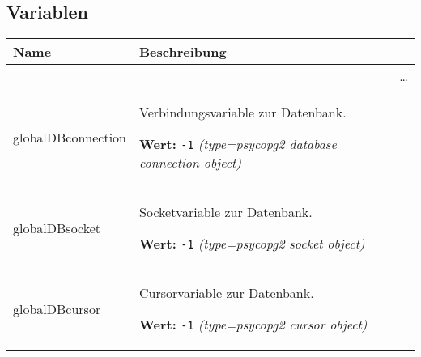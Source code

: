 
  \subsection{Variablen}

    \vspace{-1cm}
\hspace{\varindent}\begin{longtable}{|p{\varnamewidth}|p{\vardescrwidth}|l}
\cline{1-2}
\cline{1-2} \centering \textbf{Name} & \centering \textbf{Beschreibung}& \\
\cline{1-2}
\endhead\cline{1-2}\multicolumn{3}{r}{\small\ldots}\\\endfoot\cline{1-2}
\endlastfoot\raggedright g\-l\-o\-b\-a\-l\-D\-B\-c\-o\-n\-n\-e\-c\-t\-i\-o\-n\- & \raggedright Verbindungsvariable zur Datenbank.

\textbf{Wert:} 
{\tt -1}            {\it (type=psycopg2 database connection object)}&\\
\cline{1-2}
\raggedright g\-l\-o\-b\-a\-l\-D\-B\-s\-o\-c\-k\-e\-t\- & \raggedright Socketvariable zur Datenbank.

\textbf{Wert:} 
{\tt -1}            {\it (type=psycopg2 socket object)}&\\
\cline{1-2}
\raggedright g\-l\-o\-b\-a\-l\-D\-B\-c\-u\-r\-s\-o\-r\- & \raggedright Cursorvariable zur Datenbank.

\textbf{Wert:} 
{\tt -1}            {\it (type=psycopg2 cursor object)}&\\
\cline{1-2}
\end{longtable}

